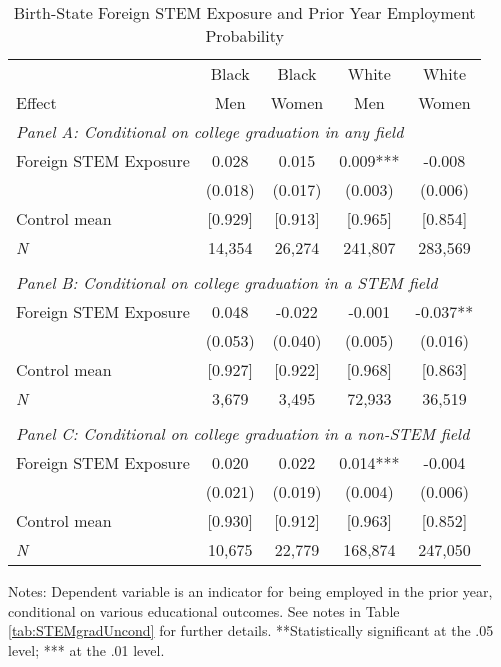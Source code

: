 \begin{table}[ht]
\caption{Birth-State Foreign STEM Exposure and Prior Year Employment Probability}
\label{tab:ProbLY}
\centering
\begin{threeparttable}
\begin{tabular}{lcccc}
\toprule 
       & Black           & Black        & White        & White       \\
Effect & Men             & Women        & Men          & Women       \\
\midrule 
\multicolumn{5}{l}{\emph{Panel A: Conditional on college graduation in any field}}\\ 
Foreign STEM Exposure & 0.028  & 0.015  & 0.009*** & -0.008  \\ 
 &  (0.018) & (0.017) & (0.003) & (0.006) \\ 
Control mean &  [0.929] & [0.913] & [0.965] & [0.854] \\ 
\emph{N} &     14,354 &    26,274 &   241,807 &   283,569 \\ 
&&&&\\
\multicolumn{5}{l}{\emph{Panel B: Conditional on college graduation in a STEM field}}\\ 
Foreign STEM Exposure & 0.048  & -0.022  & -0.001  & -0.037** \\ 
 &  (0.053) & (0.040) & (0.005) & (0.016) \\ 
Control mean &  [0.927] & [0.922] & [0.968] & [0.863] \\ 
\emph{N} &      3,679 &     3,495 &    72,933 &    36,519 \\ 
&&&&\\
\multicolumn{5}{l}{\emph{Panel C: Conditional on college graduation in a non-STEM field}}\\ 
Foreign STEM Exposure & 0.020  & 0.022  & 0.014*** & -0.004  \\ 
 &  (0.021) & (0.019) & (0.004) & (0.006) \\ 
Control mean &  [0.930] & [0.912] & [0.963] & [0.852] \\ 
\emph{N} &     10,675 &    22,779 &   168,874 &   247,050 \\ 
\bottomrule 
\end{tabular} 
\footnotesize Notes: Dependent variable is an indicator for being employed in the prior year, conditional on various educational outcomes.  See notes in Table \ref{tab:STEMgradUncond} for further details. **Statistically significant at the .05 level; *** at the .01 level.
\end{threeparttable} 
\end{table} 
